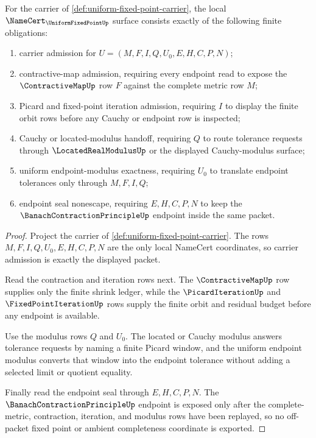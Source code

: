 \begin{theorem}
\label{thm:uniform-fixed-point-namecert-obligations}
For the carrier of \autoref{def:uniform-fixed-point-carrier}, the local $\NameCert_{\UniformFixedPointUp}$ surface consists exactly of the following finite obligations:
\begin{enumerate}
\item carrier admission for $U=(M,F,I,Q,U_0,E,H,C,P,N)$;
\item contractive-map admission, requiring every endpoint read to expose the $\ContractiveMapUp$ row $F$ against the complete metric row $M$;
\item Picard and fixed-point iteration admission, requiring $I$ to display the finite orbit rows before any Cauchy or endpoint row is inspected;
\item Cauchy or located-modulus handoff, requiring $Q$ to route tolerance requests through $\LocatedRealModulusUp$ or the displayed Cauchy-modulus surface;
\item uniform endpoint-modulus exactness, requiring $U_0$ to translate endpoint tolerances only through $M,F,I,Q$;
\item endpoint seal nonescape, requiring $E,H,C,P,N$ to keep the $\BanachContractionPrincipleUp$ endpoint inside the same packet.
\end{enumerate}
\end{theorem}
\begin{proof}
Project the carrier of \autoref{def:uniform-fixed-point-carrier}. The rows $M,F,I,Q,U_0,E,H,C,P,N$ are the only local NameCert coordinates, so carrier admission is exactly the displayed packet.

Read the contraction and iteration rows next. The $\ContractiveMapUp$ row supplies only the finite shrink ledger, while the $\PicardIterationUp$ and $\FixedPointIterationUp$ rows supply the finite orbit and residual budget before any endpoint is available.

Use the modulus rows $Q$ and $U_0$. The located or Cauchy modulus answers tolerance requests by naming a finite Picard window, and the uniform endpoint modulus converts that window into the endpoint tolerance without adding a selected limit or quotient equality.

Finally read the endpoint seal through $E,H,C,P,N$. The $\BanachContractionPrincipleUp$ endpoint is exposed only after the complete-metric, contraction, iteration, and modulus rows have been replayed, so no off-packet fixed point or ambient completeness coordinate is exported.
\end{proof}

